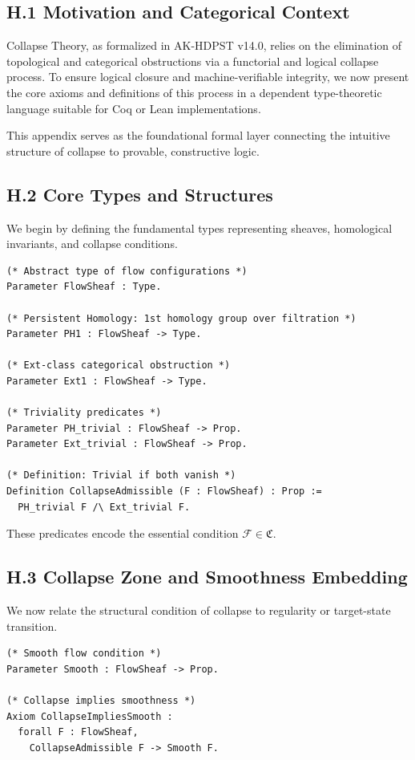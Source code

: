 \documentclass[11pt]{article}
\begin{document}
\subsection{H.1 Motivation and Categorical Context}

Collapse Theory, as formalized in AK-HDPST v14.0, relies on the elimination of topological and categorical obstructions via a functorial and logical collapse process. To ensure logical closure and machine-verifiable integrity, we now present the core axioms and definitions of this process in a dependent type-theoretic language suitable for Coq or Lean implementations.

This appendix serves as the foundational formal layer connecting the intuitive structure of collapse to provable, constructive logic.

\subsection{H.2 Core Types and Structures}

We begin by defining the fundamental types representing sheaves, homological invariants, and collapse conditions.

\begin{lstlisting}[language=Coq, caption=Core Types]
(* Abstract type of flow configurations *)
Parameter FlowSheaf : Type.

(* Persistent Homology: 1st homology group over filtration *)
Parameter PH1 : FlowSheaf -> Type.

(* Ext-class categorical obstruction *)
Parameter Ext1 : FlowSheaf -> Type.

(* Triviality predicates *)
Parameter PH_trivial : FlowSheaf -> Prop.
Parameter Ext_trivial : FlowSheaf -> Prop.

(* Definition: Trivial if both vanish *)
Definition CollapseAdmissible (F : FlowSheaf) : Prop :=
  PH_trivial F /\ Ext_trivial F.
\end{lstlisting}

These predicates encode the essential condition $\mathcal{F} \in \mathfrak{C}$.

\subsection{H.3 Collapse Zone and Smoothness Embedding}

We now relate the structural condition of collapse to regularity or target-state transition.

\begin{lstlisting}[language=Coq, caption=Collapse and Smoothness]
(* Smooth flow condition *)
Parameter Smooth : FlowSheaf -> Prop.

(* Collapse implies smoothness *)
Axiom CollapseImpliesSmooth :
  forall F : FlowSheaf,
    CollapseAdmissible F -> Smooth F.
\end{lstlisting}
\end{document}
